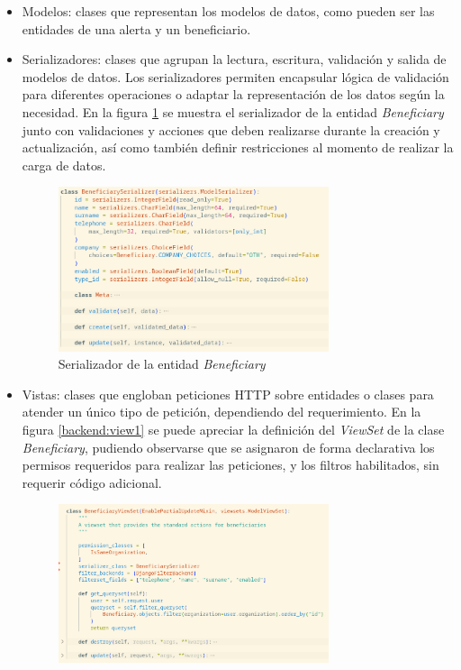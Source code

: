 \begin{itemize}
	\item Modelos: clases que representan los modelos de datos, como pueden ser las entidades de una alerta y un beneficiario.
	\item Serializadores: clases que agrupan la lectura, escritura, validación y salida de modelos de datos. Los serializadores permiten encapsular lógica de validación para diferentes operaciones o adaptar la representación de los datos según la necesidad\citep{DJANGO:8}. En la figura \ref{backend:serializer1} se muestra el serializador de la entidad \textit{Beneficiary} junto con validaciones y acciones que deben realizarse durante la creación y actualización, así como también definir restricciones al momento de realizar la carga de datos.
	\begin{figure}[H]
	\centering
	\includegraphics[width=0.75\textwidth]{./Figures/backend-serializer1.png}
	\caption{Serializador de la entidad \textit{Beneficiary}}
	\label{backend:serializer1}
    \end{figure}
	\item Vistas: clases que engloban peticiones HTTP sobre entidades o clases para atender un único tipo de petición, dependiendo del requerimiento\citep{DJANGO:9}. En la figura \ref{backend:view1} se puede apreciar la definición del \textit{ViewSet} de la clase \textit{Beneficiary}, pudiendo observarse que se asignaron de forma declarativa los permisos requeridos para realizar las peticiones, y los filtros habilitados, sin requerir código adicional.
		\begin{figure}[H]
	\centering
	\includegraphics[width=0.75\textwidth]{./Figures/backend-view1.png}

\end{figure}
\end{itemize}
